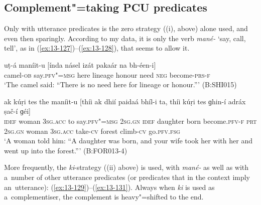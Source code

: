\subsection{Complement"=taking PCU predicates}
\label{subsec:13-5-1}

 Only with utterance predicates is the zero strategy ((i), above) alone used, and even then sparingly. According to my data, it is only the verb \textit{mané-} `say, call, tell', as in (\ref{ex:13-127})--(\ref{ex:13-128}), that seems to allow it.

\begin{exe}
\ex
\label{ex:13-127}
\gll uṭ-á maníit-u [índa násel izát pakaár  na bh-éen-i]  \\
camel-\textsc{ob}  say.\textsc{pfv"=msg} here lineage honour need  \textsc{neg} become-\textsc{prs-f} \\
\glt `The camel said: ``There is no need here for lineage or honour.''' (B:SHI015)

\ex
\label{ex:13-128}
\gll ak kúṛi tes the maníit-u [thíi ak  dhií paidaá bhíl-i ta, thíi
  kúṛi tes  ɡhin-í adráx ṣač-í ɡéi] \\
\textsc{idef} woman \textsc{3sg.acc} to say.\textsc{pfv"=msg} \textsc{2sg.gn} \textsc{idef}  daughter born become.\textsc{pfv-f} \textsc{prt} \textsc{2sg.gn} woman \textsc{3sg.acc}  take-\textsc{cv} forest climb-\textsc{cv} go.\textsc{pfv.fsg}  \\
\glt `A woman told him: ``A daughter was born, and your wife took her with her and went up into the forest.''' (B:FOR013-4) 
\end{exe}

More frequently, the \textit{ki}-strategy ((ii) above) is used, with \textit{mané-} as well as with a~number of other utterance predicates (or predicates that in the context imply an~utterance): (\ref{ex:13-129})--(\ref{ex:13-131}). Always when \textit{ki} is used as a~complementiser, the complement is heavy"=shifted to the end.

